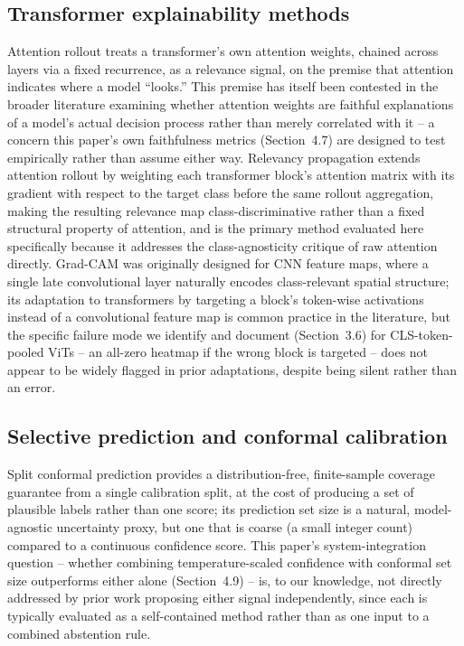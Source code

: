 \documentclass[runningheads]{llncs}
\begin{document}
\subsection{Transformer explainability methods}

Attention rollout \cite{abnar2020quantifying} treats a transformer's own
attention weights, chained across layers via a fixed recurrence, as a
relevance signal, on the premise that attention indicates where a model
``looks.'' This premise has itself been contested in the broader
literature examining whether attention weights are faithful explanations
of a model's actual decision process rather than merely correlated with
it -- a concern this paper's own faithfulness metrics (Section~4.7) are
designed to test empirically rather than assume either way. Relevancy
propagation \cite{chefer2021transformer} extends attention rollout by
weighting each transformer block's attention matrix with its gradient
with respect to the target class before the same rollout aggregation,
making the resulting relevance map class-discriminative rather than a
fixed structural property of attention, and is the primary method
evaluated here specifically because it addresses the class-agnosticity
critique of raw attention directly. Grad-CAM \cite{selvaraju2017gradcam}
was originally designed for CNN feature maps, where a single late
convolutional layer naturally encodes class-relevant spatial structure;
its adaptation to transformers by targeting a block's token-wise
activations instead of a convolutional feature map is common practice in
the literature, but the specific failure mode we identify and document
(Section~3.6) for CLS-token-pooled ViTs -- an all-zero heatmap if the
wrong block is targeted -- does not appear to be widely flagged in prior
adaptations, despite being silent rather than an error.

\subsection{Selective prediction and conformal calibration}

Split conformal prediction provides a distribution-free, finite-sample
coverage guarantee from a single calibration split, at the cost of
producing a set of plausible labels rather than one score; its prediction
set size is a natural, model-agnostic uncertainty proxy, but one that is
coarse (a small integer count) compared to a continuous confidence score.
This paper's system-integration question -- whether combining
temperature-scaled confidence with conformal set size outperforms either
alone (Section~4.9) -- is, to our knowledge, not directly addressed by
prior work proposing either signal independently, since each is typically
evaluated as a self-contained method rather than as one input to a
combined abstention rule.
\end{document}

